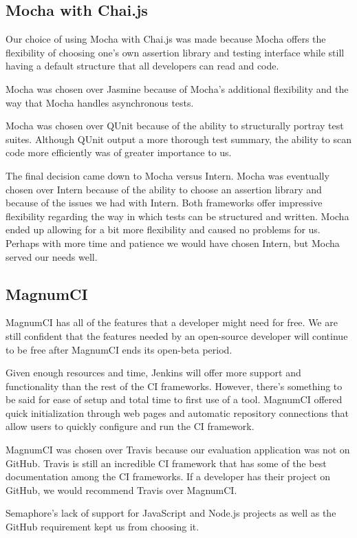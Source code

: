 \documentclass[12pt]{ucthesis}
\begin{document}
\subsection{Mocha with Chai.js}
Our choice of using Mocha with Chai.js was made because Mocha offers the flexibility of choosing one's own assertion library and testing interface while still having a default structure that all developers can read and code.

Mocha was chosen over Jasmine because of Mocha's additional flexibility and the way that Mocha handles asynchronous tests.

Mocha was chosen over QUnit because of the ability to structurally portray test suites. Although QUnit output a more thorough test summary, the ability to scan code more efficiently was of greater importance to us.

The final decision came down to Mocha versus Intern. Mocha was eventually chosen over Intern because of the ability to choose an assertion library and because of the issues we had with Intern. Both frameworks offer impressive flexibility regarding the way in which tests can be structured and written. Mocha ended up allowing for a bit more flexibility and caused no problems for us. Perhaps with more time and patience we would have chosen Intern, but Mocha served our needs well.

\subsection{MagnumCI}
MagnumCI has all of the features that a developer might need for free. We are still confident that the features needed by an open-source developer will continue to be free after MagnumCI ends its open-beta period.

Given enough resources and time, Jenkins will offer more support and functionality than the rest of the CI frameworks. However, there's something to be said for ease of setup and total time to first use of a tool. MagnumCI offered quick initialization through web pages and automatic repository connections that allow users to quickly configure and run the CI framework.

MagnumCI was chosen over Travis because our evaluation application was not on GitHub. Travis is still an incredible CI framework that has some of the best documentation among the CI frameworks. If a developer has their project on GitHub, we would recommend Travis over MagnumCI.

Semaphore's lack of support for JavaScript and Node.js projects as well as the GitHub requirement kept us from choosing it.
\end{document}
